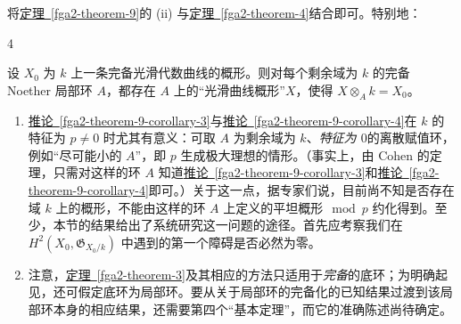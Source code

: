 \par{}将\hyperref[fga2-theorem-9]{定理~\ref*{fga2-theorem-9}}的 (ii) 与\hyperref[fga2-theorem-4]{定理~\ref*{fga2-theorem-4}}结合即可。特别地：
\begin{corollary}{4}\label{fga2-theorem-9-corollary-4}\skipsinglepar
\par{}设 \(X_0\) 为 \(k\) 上一条完备光滑代数曲线的概形。则对每个剩余域为 \(k\) 的完备 Noether 局部环 \(A\)，都存在 \(A\) 上的“光滑曲线概形”\(X\)，使得 \(X\otimes _Ak=X_0\)。\end{corollary}
\begin{remarks}{}\label{fga2-6-remarks}\skipsinglepar
\begin{enumerate}\item{}\hyperref[fga2-theorem-9-corollary-3]{推论~\ref*{fga2-theorem-9-corollary-3}}与\hyperref[fga2-theorem-9-corollary-4]{推论~\ref*{fga2-theorem-9-corollary-4}}在 \(k\) 的特征为 \(p\neq 0\) 时尤其有意义：可取 \(A\) 为剩余域为 \(k\)、\emph{特征为 \(0\)}的离散赋值环，例如“尽可能小的 \(A\)”，即 \(p\) 生成极大理想的情形。（事实上，由 Cohen 的定理，只需对这样的环 \(A\) 知道\hyperref[fga2-theorem-9-corollary-3]{推论~\ref*{fga2-theorem-9-corollary-3}}和\hyperref[fga2-theorem-9-corollary-4]{推论~\ref*{fga2-theorem-9-corollary-4}}即可。）关于这一点，据专家们说，目前尚不知是否存在域 \(k\) 上的概形，不能由这样的环 \(A\) 上定义的平坦概形\(\mod  p\) 约化得到。至少，本节的结果给出了系统研究这一问题的途径。首先应考察我们在 \(H^2(X_0,\mathfrak {G}_{X_0/k})\) 中遇到的第一个障碍是否必然为零。

    \item{}注意，\hyperref[fga2-theorem-3]{定理~\ref*{fga2-theorem-3}}及其相应的方法只适用于\emph{完备}的底环；为明确起见，还可假定底环为局部环。要从关于局部环的完备化的已知结果过渡到该局部环本身的相应结果，还需要第四个“基本定理”，而它的准确陈述尚待确定。


\end{enumerate}
\end{remarks}
